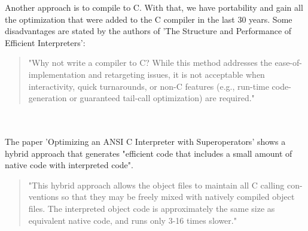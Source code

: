 \documentclass{article}
\begin{document}
Another approach is to compile to C. With that, we have portability and gain
all the optimization that were added to the C compiler in the last 30 years.
Some disadvantages are stated by the authors of 'The Structure and Performance
of Efficient Interpreters':

\begin{quotation} 
"Why not write a compiler to C? While this method addresses the
ease-of-implementation and retargeting issues, it is not acceptable when
interactivity, quick turnarounds, or non-C features (e.g., run-time
code-generation or guaranteed tail-call optimization) are required."
~\cite{structure_and_performance}
\end{quotation} 
\\\\
The paper 'Optimizing an ANSI C Interpreter with Superoperators' shows a hybrid
approach that generates "efficient code that includes a small amount of native
code with interpreted code". ~\cite{superoperators}

\begin{quotation}
"This hybrid approach allows the object files to maintain all C calling con-
ventions so that they may be freely mixed with natively compiled object
files. The interpreted object code is approximately the same size as
equivalent native code, and runs only 3-16 times slower." ~\cite{superoperators}
\end{quotation}
\end{document}

